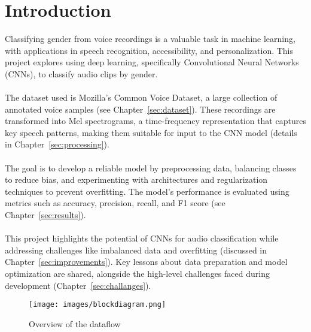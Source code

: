 \section{Introduction}

Classifying gender from voice recordings is a valuable task in machine learning, with applications in speech recognition, accessibility, and personalization. This project explores using deep learning, specifically Convolutional Neural Networks (CNNs), to classify audio clips by gender.

\paragraph{} The dataset used is Mozilla's Common Voice Dataset, a large collection of annotated voice samples (see Chapter~\ref{sec:dataset}). These recordings are transformed into Mel spectrograms, a time-frequency representation that captures key speech patterns, making them suitable for input to the CNN model (details in Chapter~\ref{sec:processing}).

\paragraph{} The goal is to develop a reliable model by preprocessing data, balancing classes to reduce bias, and experimenting with architectures and regularization techniques to prevent overfitting. The model's performance is evaluated using metrics such as accuracy, precision, recall, and F1 score (see Chapter~\ref{sec:results}).

\paragraph{} This project highlights the potential of CNNs for audio classification while addressing challenges like imbalanced data and overfitting (discussed in Chapter~\ref{sec:improvements}). Key lessons about data preparation and model optimization are shared, alongside the high-level challenges faced during development (Chapter~\ref{sec:challanges}).

\begin{figure}[h] \centering \texttt{[image: images/blockdiagram.png]} \caption{Overview of the dataflow} \label{fig:dataflow} \end{figure}